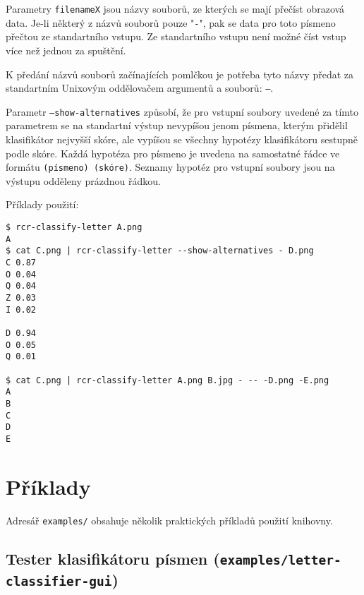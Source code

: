 \documentclass[a4paper]{article}
\begin{document}
Parametry \texttt{filenameX} jsou názvy souborů, ze kterých se mají přečíst
obrazová data. Je-li některý z názvů souborů pouze "\texttt{-}", pak se data
pro toto písmeno přečtou ze standartního vstupu. Ze standartního vstupu
není možné číst vstup více než jednou za spuštění.

K předání názvů souborů začínajících pomlčkou je potřeba tyto názvy předat
za standartním Unixovým oddělovačem argumentů a souborů: \texttt{--}.

Parametr \texttt{--show-alternatives} způsobí, že pro vstupní soubory
uvedené za tímto parametrem se na standartní výstup nevypíšou jenom
písmena, kterým přidělil klasifikátor nejvyšší skóre, ale vypíšou se
všechny hypotézy klasifikátoru sestupně podle skóre. Každá hypotéza
pro písmeno je uvedena na samostatné řádce ve formátu \texttt{(písmeno)
(skóre)}. Seznamy hypotéz pro vstupní soubory jsou na výstupu odděleny prázdnou
řádkou.

Příklady použití:
\begin{lstlisting}
$ rcr-classify-letter A.png
A
$ cat C.png | rcr-classify-letter --show-alternatives - D.png
C 0.87
O 0.04
Q 0.04
Z 0.03
I 0.02

D 0.94
O 0.05
Q 0.01

$ cat C.png | rcr-classify-letter A.png B.jpg - -- -D.png -E.png
A
B
C
D
E
\end{lstlisting}

\section{Příklady}
Adresář \texttt{examples/} obsahuje několik praktických příkladů použití knihovny.

\subsection{Tester klasifikátoru písmen
(\texttt{examples/letter-classifier-gui})}
\end{document}
